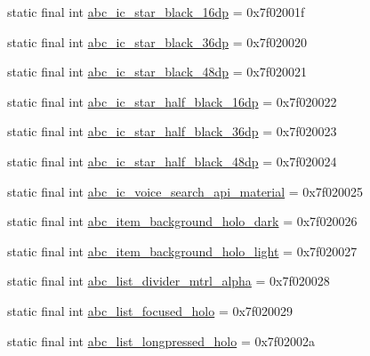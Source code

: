 \begin{CompactItemize}
static final int \hyperlink{classandroid_1_1support_1_1v7_1_1recyclerview_1_1_r_1_1drawable_134af509515dd47c6fbc098792b3962a}{abc\_\-ic\_\-star\_\-black\_\-16dp} = 0x7f02001f
\item 
static final int \hyperlink{classandroid_1_1support_1_1v7_1_1recyclerview_1_1_r_1_1drawable_57c1228b9c718d227997a52cda6f96c3}{abc\_\-ic\_\-star\_\-black\_\-36dp} = 0x7f020020
\item 
static final int \hyperlink{classandroid_1_1support_1_1v7_1_1recyclerview_1_1_r_1_1drawable_e75bebfcdb71b3b5464b516aa3d4f984}{abc\_\-ic\_\-star\_\-black\_\-48dp} = 0x7f020021
\item 
static final int \hyperlink{classandroid_1_1support_1_1v7_1_1recyclerview_1_1_r_1_1drawable_b288805ca15b5defcb2d76cb3c7e568e}{abc\_\-ic\_\-star\_\-half\_\-black\_\-16dp} = 0x7f020022
\item 
static final int \hyperlink{classandroid_1_1support_1_1v7_1_1recyclerview_1_1_r_1_1drawable_904367d40131ed95a7e9d154860d8fa8}{abc\_\-ic\_\-star\_\-half\_\-black\_\-36dp} = 0x7f020023
\item 
static final int \hyperlink{classandroid_1_1support_1_1v7_1_1recyclerview_1_1_r_1_1drawable_9496f8206544fd01c10d1d8b7830507a}{abc\_\-ic\_\-star\_\-half\_\-black\_\-48dp} = 0x7f020024
\item 
static final int \hyperlink{classandroid_1_1support_1_1v7_1_1recyclerview_1_1_r_1_1drawable_6e07edb4984173c45a851f3318113517}{abc\_\-ic\_\-voice\_\-search\_\-api\_\-material} = 0x7f020025
\item 
static final int \hyperlink{classandroid_1_1support_1_1v7_1_1recyclerview_1_1_r_1_1drawable_5e8cefc9c1b48a5b7d41bb338e0a88dd}{abc\_\-item\_\-background\_\-holo\_\-dark} = 0x7f020026
\item 
static final int \hyperlink{classandroid_1_1support_1_1v7_1_1recyclerview_1_1_r_1_1drawable_56df9356e13bb3516b2c988cdf651a9d}{abc\_\-item\_\-background\_\-holo\_\-light} = 0x7f020027
\item 
static final int \hyperlink{classandroid_1_1support_1_1v7_1_1recyclerview_1_1_r_1_1drawable_64c2200be35bb3f710a830c033997a53}{abc\_\-list\_\-divider\_\-mtrl\_\-alpha} = 0x7f020028
\item 
static final int \hyperlink{classandroid_1_1support_1_1v7_1_1recyclerview_1_1_r_1_1drawable_5d4609b5e7d2cdccfc45ab044ea79709}{abc\_\-list\_\-focused\_\-holo} = 0x7f020029
\item 
static final int \hyperlink{classandroid_1_1support_1_1v7_1_1recyclerview_1_1_r_1_1drawable_432fb74a5a5cdf9eec42eace5fa048f1}{abc\_\-list\_\-longpressed\_\-holo} = 0x7f02002a

\end{CompactItemize}
